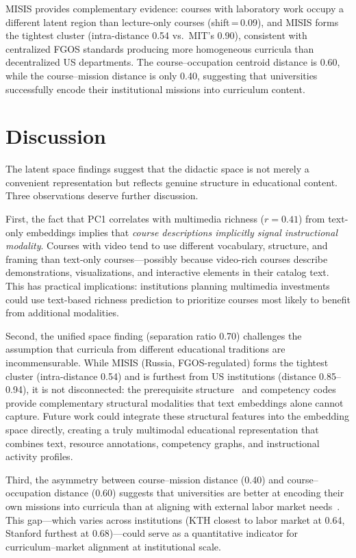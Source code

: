 \documentclass[sigconf,review]{acmart}
\begin{document}
MISIS provides complementary evidence: courses with laboratory work occupy a different latent region than lecture-only courses (shift\,=\,0.09), and MISIS forms the tightest cluster (intra-distance 0.54 vs.\ MIT's 0.90), consistent with centralized FGOS standards producing more homogeneous curricula than decentralized US departments. The course--occupation centroid distance is 0.60, while the course--mission distance is only 0.40, suggesting that universities successfully encode their institutional missions into curriculum content.


\section{Discussion}
\label{sec:discussion}

The latent space findings suggest that the didactic space is not merely a convenient representation but reflects genuine structure in educational content.
Three observations deserve further discussion.

First, the fact that PC1 correlates with multimedia richness ($r{=}0.41$) from text-only embeddings implies that \emph{course descriptions implicitly signal instructional modality}.
Courses with video tend to use different vocabulary, structure, and framing than text-only courses---possibly because video-rich courses describe demonstrations, visualizations, and interactive elements in their catalog text.
This has practical implications: institutions planning multimedia investments could use text-based richness prediction to prioritize courses most likely to benefit from additional modalities.

Second, the unified space finding (separation ratio 0.70) challenges the assumption that curricula from different educational traditions are incommensurable.
While MISIS (Russia, FGOS-regulated) forms the tightest cluster (intra-distance 0.54) and is furthest from US institutions (distance 0.85--0.94), it is not disconnected: the prerequisite structure~\cite{shi2020} and competency codes provide complementary structural modalities that text embeddings alone cannot capture.
Future work could integrate these structural features into the embedding space directly, creating a truly multimodal educational representation that combines text, resource annotations, competency graphs, and instructional activity profiles.

Third, the asymmetry between course--mission distance (0.40) and course--occupation distance (0.60) suggests that universities are better at encoding their own missions into curricula than at aligning with external labor market needs~\cite{wef2023futureofwork}.
This gap---which varies across institutions (KTH closest to labor market at 0.64, Stanford furthest at 0.68)---could serve as a quantitative indicator for curriculum--market alignment at institutional scale.
\end{document}
